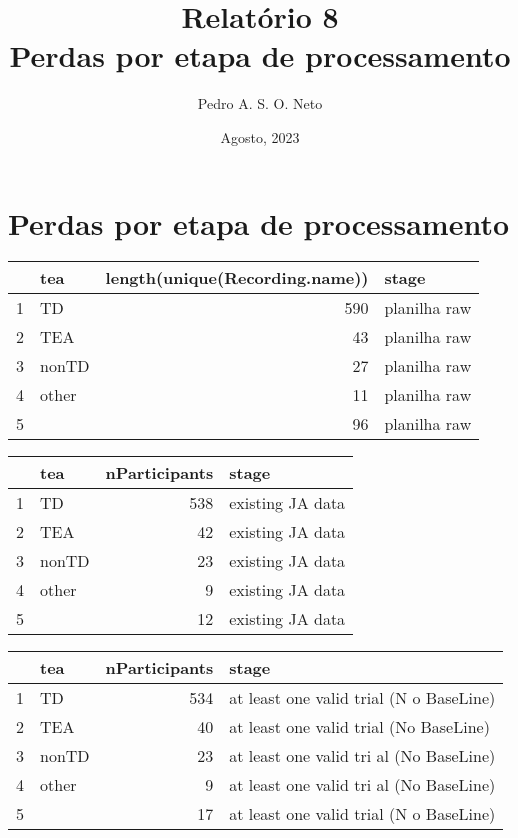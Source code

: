 \documentclass{article}
\title{Relatório 8 \\ Perdas por etapa de processamento}
\author{Pedro A. S. O. Neto}
\date{Agosto, 2023}
\begin{document}
\maketitle

\section{Perdas por etapa de processamento}


\begin{table}[ht]
\centering
\begin{tabular}{rlrl}
  \hline
 & tea & length(unique(Recording.name)) & 
stage \\ 
  \hline
1 & TD & 590 & planilha raw \\ 
  2 & TEA &  43 & planilha raw \\ 
  3 & nonTD &  27 & planilha raw \\ 
  4 & other &  11 & planilha raw \\ 
  5 &  &  96 & planilha raw \\ 
   \hline
\end{tabular}
\end{table}

\begin{table}[ht]
\centering
\begin{tabular}{rlrl}
  \hline
 & tea & nParticipants & stage \\ 
  \hline
1 & TD & 538 & existing JA data \\ 
  2 & TEA &  42 & existing JA data \\ 
  3 & nonTD &  23 & existing JA data \\ 
  4 & other &   9 & existing JA data \\ 
  5 &  &  12 & existing JA data \\ 
   \hline
\end{tabular}
\end{table}

\begin{table}[ht]
\centering
\begin{tabular}{rlrl}
  \hline
 & tea & nParticipants & stage \\ 
  \hline
1 & TD & 534 & at least one valid trial (N
o BaseLine) \\ 
  2 & TEA &  40 & at least one valid trial
 (No BaseLine) \\ 
  3 & nonTD &  23 & at least one valid tri
al (No BaseLine) \\ 
  4 & other &   9 & at least one valid tri
al (No BaseLine) \\ 
  5 &  &  17 & at least one valid trial (N
o BaseLine) \\ 
   \hline
\end{tabular}
\end{table}
\end{document}
